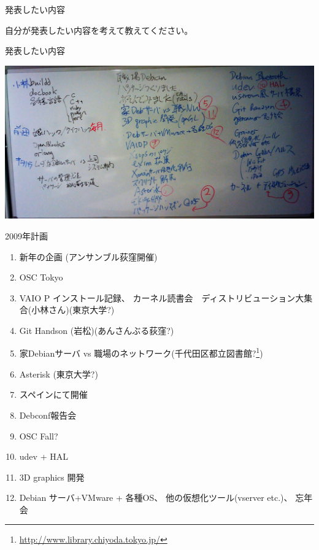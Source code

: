 {\footnotesize

}



\begin{frame}{発表したい内容}

自分が発表したい内容を考えて教えてください。

\end{frame}


\begin{frame}{発表したい内容}

\includegraphics[width=1\hsize]{image200901/brainstorming.jpg}

\end{frame}

\begin{frame}{2009年計画}

{\scriptsize
 \begin{enumerate}
  \item 新年の企画 (アンサンブル荻窪開催)
  \item OSC Tokyo
  \item VAIO P インストール記録、
	カーネル読書会　ディストリビューション大集合(小林さん)(東京大学?)
  \item Git Handson (岩松)(あんさんぶる荻窪?)
  \item 家Debianサーバ vs 職場のネットワーク(千代田区都立図書館?\footnote{\url{http://www.library.chiyoda.tokyo.jp/}})
  \item Asterisk (東京大学?)
  \item スペインにて開催
  \item Debconf報告会
  \item OSC Fall?
  \item udev + HAL
  \item 3D graphics 開発
  \item Debian サーバ+VMware + 各種OS、
	他の仮想化ツール(vserver etc.)、
	忘年会
 \end{enumerate}
}
\end{frame}

